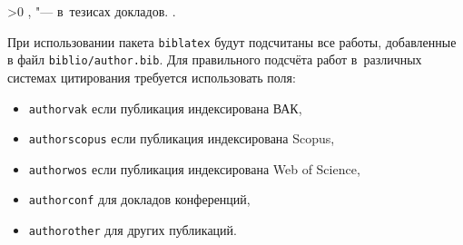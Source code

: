 {\begin{refsection}[bl-author]
        \iffalse %
        {\publications} Основные результаты по теме диссертации изложены в~\arabic{citeauthor}~печатных изданиях,
        \arabic{citeauthorvak} из которых изданы в журналах, рекомендованных ВАК\sloppy%
        \ifnum \value{citeauthorscopuswos}>0%
            , \arabic{citeauthorscopuswos} "--- в~периодических научных журналах, индексируемых Web of~Science и Scopus\sloppy%
        \fi%
        \ifnum \value{citeauthorconf}>0%
            ,  "--- в~тезисах докладов.
        \else%
            .
        \fi
        \fi
    \end{refsection}%
    \begin{refsection}[bl-author]
        \nocite{Болотин_Карпов_Рашков_Шкурак_2019}%
        \nocite{dream1}%
        \nocite{dream2}%
        \nocite{pseudolabel}
        \nocite{dream1_trudy}%
        \nocite{Дуплякин_Дмитрий_Ондар_Ушаков_2021}%
        \nocite{rumtl}
        \nocite{rutopics}
        \nocite{enmtl}
        \nocite{dp_2023}
    \end{refsection}%
    \ifsynopsis
    \fi
}
\iffalse
При использовании пакета \verb!biblatex! будут подсчитаны все работы, добавленные
в файл \verb!biblio/author.bib!. Для правильного подсчёта работ в~различных
системах цитирования требуется использовать поля:
\begin{itemize}
        \item \texttt{authorvak} если публикация индексирована ВАК,
        \item \texttt{authorscopus} если публикация индексирована Scopus,
        \item \texttt{authorwos} если публикация индексирована Web of Science,
        \item \texttt{authorconf} для докладов конференций,
        \item \texttt{authorother} для других публикаций.
\end{itemize}
